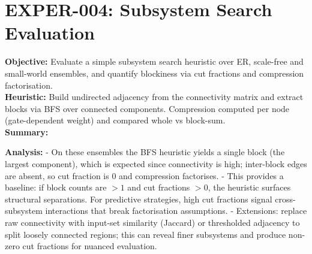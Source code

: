 \documentclass{article}
\begin{document}
\section{EXPER-004: Subsystem Search Evaluation}
\textbf{Objective:} Evaluate a simple subsystem search heuristic over ER, scale-free and small-world ensembles, and quantify blockiness via cut fractions and compression factorisation.\\
\textbf{Heuristic:} Build undirected adjacency from the connectivity matrix and extract blocks via BFS over connected components. Compression computed per node (gate-dependent weight) and compared whole vs block-sum.\\
\textbf{Summary:}\\
\begin{center}
\end{center}
\textbf{Analysis:}
- On these ensembles the BFS heuristic yields a single block (the largest component), which is expected since connectivity is high; inter-block edges are absent, so cut fraction is $0$ and compression factorises.
- This provides a baseline: if block counts are $>1$ and cut fractions $>0$, the heuristic surfaces structural separations. For predictive strategies, high cut fractions signal cross-subsystem interactions that break factorisation assumptions.
- Extensions: replace raw connectivity with input-set similarity (Jaccard) or thresholded adjacency to split loosely connected regions; this can reveal finer subsystems and produce non-zero cut fractions for nuanced evaluation.
\end{document}
